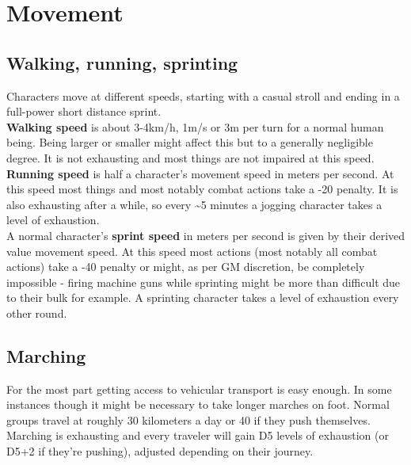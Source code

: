 \documentclass[12pt,a4paper,openany,usenames,dvipsnames]{book}
\begin{document}
	

	\chapter{Movement}
	\section{Walking, running, sprinting}
	Characters move at different speeds, starting with a casual stroll and ending in a full-power short distance sprint.\\
	\textbf{Walking speed} is about 3-4km/h, 1m/s or 3m per turn for a normal human being. Being larger or smaller might affect this but to a generally negligible degree. It is not exhausting and most things are not impaired at this speed.\\
	\textbf{Running speed} is half a character’s movement speed in meters per second. At this speed most things and most notably combat actions take a -20 penalty. It is also exhausting after a while, so every \sim 5 minutes a jogging character takes a level of exhaustion.\\
	A normal character’s \textbf{sprint speed} in meters per second is given by their derived value movement speed.
	At this speed most actions (most notably all combat actions)
		take a -40 penalty
		or might, as per GM discretion, be completely impossible
		- firing machine guns while sprinting might be more than difficult due to their bulk for example.
	A sprinting character takes a level of exhaustion every other round.
	\section{Marching}
	For the most part getting access to vehicular transport is easy enough. In some instances though it might be necessary to take longer marches on foot. Normal groups travel at roughly 30 kilometers a day or 40 if they push themselves. Marching is exhausting and every traveler will gain D5 levels of exhaustion (or D5+2 if they're pushing), adjusted depending on their journey.
\end{document}
